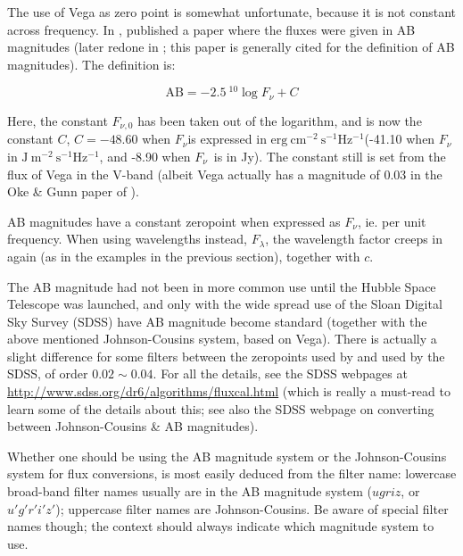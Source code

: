 \documentclass[12pt,a4paper]{article}
\newcommand{\fv}{\ensuremath{F_{\nu}}}
\newcommand{\fl}{\ensuremath{F_{\lambda}}}
\newcommand{\fvz}{\ensuremath{F_{\nu, 0}}}
\newcommand{\jmsqshz}{\ensuremath{\mathrm{J}\ \mathrm{m}^{-2}\ \mathrm{s^{-1}} \mathrm{Hz^{-1}}}}
\newcommand{\ergcmsqshz}{\ensuremath{\mathrm{erg}\ \mathrm{cm}^{-2}\ \mathrm{s^{-1}} \mathrm{Hz^{-1}}}}
\begin{document}
The use of Vega as zero point is somewhat unfortunate, because it is not constant across frequency. In \citeyear{oke1974:apjs27:210}, \citeauthor{oke1974:apjs27:210} published a paper where the fluxes were given in AB magnitudes (later redone in \citet{oke1983:apj226:713}; this paper is generally cited for the definition of AB magnitudes). The definition is:

\begin{equation*}
\mathrm{AB} = -2.5\ {}^{10}\!\log{\fv} + C
\end{equation*}

Here, the constant $\fvz$ has been taken out of the logarithm, and is now the constant $C$, $C = -48.60$ when \fv is expressed in \ergcmsqshz (-41.10 when \fv in \jmsqshz, and -8.90 when \fv\ is in Jy). The constant still is set from the flux of Vega in the V-band (albeit Vega actually has a magnitude of 0.03 in the Oke \& Gunn paper of \citeyear{oke1983:apj226:713}).

AB magnitudes have a constant zeropoint when expressed as \fv, ie. per unit frequency. When using wavelengths instead, \fl, the wavelength factor creeps in again (as in the examples in the previous section), together with $c$.

The AB magnitude had not been in more common use until the Hubble Space Telescope was launched, and only with the wide spread use of the Sloan Digital Sky Survey (SDSS) have AB magnitude become standard (together with the above mentioned Johnson-Cousins system, based on Vega). There is actually a slight difference for some filters between the zeropoints used by \citeauthor{oke1983:apj226:713} and used by the SDSS, of order $0.02 \sim 0.04$. For all the details, see the SDSS webpages at \url{http://www.sdss.org/dr6/algorithms/fluxcal.html} (which is really a must-read to learn some of the details about this; see also the SDSS webpage on converting between Johnson-Cousins \& AB magnitudes).

Whether one should be using the AB magnitude system or the Johnson-Cousins system for flux conversions, is most easily deduced from the filter name: lowercase broad-band filter names usually are in the AB magnitude system ($ugriz$, or $u'g'r'i'z'$); uppercase filter names are Johnson-Cousins. Be aware of special filter names though; the context should always indicate which magnitude system to use.
\end{document}

